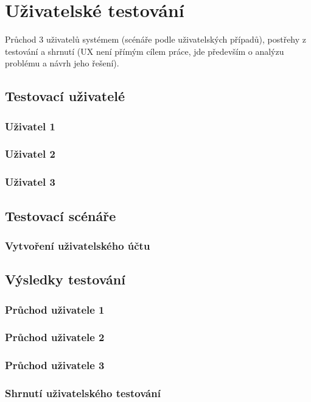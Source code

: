 
\section{Uživatelské testování}\label{sec:uživatelskéTestování}

Průchod 3 uživatelů systémem (scénáře podle uživatelských případů), postřehy z testování a shrnutí (UX není přímým cílem práce, jde především o analýzu problému a návrh jeho řešení).

\subsection{Testovací uživatelé}

\subsubsection{Uživatel 1}

\subsubsection{Uživatel 2}

\subsubsection{Uživatel 3}

\subsection{Testovací scénáře}

\subsubsection{Vytvoření uživatelského účtu}

\subsection{Výsledky testování}

\subsubsection{Průchod uživatele 1}

\subsubsection{Průchod uživatele 2}

\subsubsection{Průchod uživatele 3}

\subsubsection{Shrnutí uživatelského testování}
